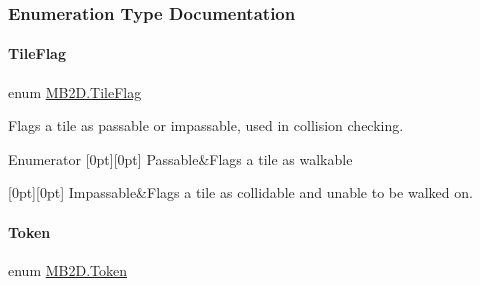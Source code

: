 \subsubsection{Enumeration Type Documentation}
\hypertarget{namespace_m_b2_d_a3ff821c2c17b424864d890d0b26536ea}{}\label{namespace_m_b2_d_a3ff821c2c17b424864d890d0b26536ea} 
\paragraph{\texorpdfstring{Tile\+Flag}{TileFlag}}
{\footnotesize\ttfamily enum \hyperlink{namespace_m_b2_d_a3ff821c2c17b424864d890d0b26536ea}{M\+B2\+D.\+Tile\+Flag}\hspace{0.3cm}{\ttfamily [strong]}}



Flags a tile as passable or impassable, used in collision checking. 

\begin{DoxyEnumFields}{Enumerator}
[0pt][0pt]{}\hypertarget{namespace_m_b2_d_a3ff821c2c17b424864d890d0b26536eaa01bb7f8bb1804fb74130d34c8c977a99}{}\label{namespace_m_b2_d_a3ff821c2c17b424864d890d0b26536eaa01bb7f8bb1804fb74130d34c8c977a99} 
Passable&Flags a tile as walkable \\
\hline

[0pt][0pt]{}\hypertarget{namespace_m_b2_d_a3ff821c2c17b424864d890d0b26536eaa02518d4f54df131d84d3b77bcb2bdce4}{}\label{namespace_m_b2_d_a3ff821c2c17b424864d890d0b26536eaa02518d4f54df131d84d3b77bcb2bdce4} 
Impassable&Flags a tile as collidable and unable to be walked on. \\
\hline

\end{DoxyEnumFields}
\hypertarget{namespace_m_b2_d_ab170e7e7db86e5ccb0ae156c0d9a6002}{}\label{namespace_m_b2_d_ab170e7e7db86e5ccb0ae156c0d9a6002} 
\paragraph{\texorpdfstring{Token}{Token}}
{\footnotesize\ttfamily enum \hyperlink{namespace_m_b2_d_ab170e7e7db86e5ccb0ae156c0d9a6002}{M\+B2\+D.\+Token}\hspace{0.3cm}{\ttfamily [strong]}}



